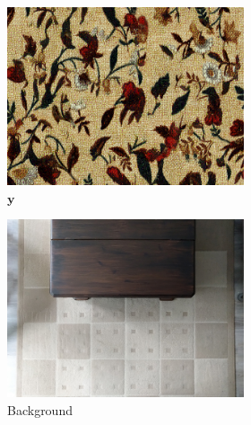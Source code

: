 \begin{figure}[]
    \begin{subfigure}{\textwidth}
        \centering
        \begin{subfigure}{0.24\textwidth}
            \centering
            \includegraphics[width=\textwidth]{images/04-experiment02/carpet/flowers2/target.jpg}
            \caption*{\(\bm{y}\)}
        \end{subfigure}
        \hfill
        \begin{subfigure}{0.24\textwidth}
            \centering
            \includegraphics[width=\textwidth]{images/04-experiment02/carpet/bg.jpg}
            \caption*{Background}
        \end{subfigure}
        \hfill
        \begin{subfigure}{0.24\textwidth}

\end{subfigure}
\end{subfigure}
\end{figure}
